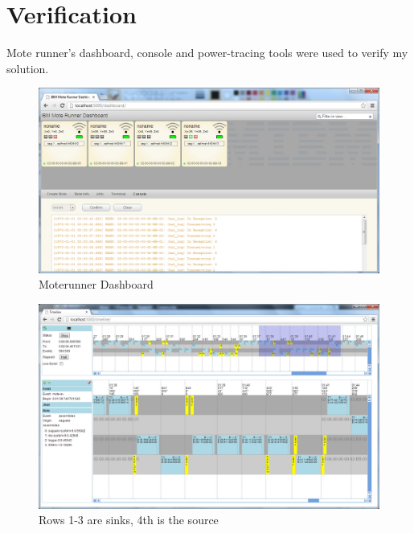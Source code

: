 \documentclass{article}
\begin{document}

\section{Verification}

Mote runner's dashboard, console and power-tracing tools were used to verify my solution.

\noindent\begin{figure}
\centerline{\includegraphics[scale=0.5]{verification-dashboard}}
\caption{Moterunner Dashboard}
\label{fig:verification-dashboard}
\end{figure}
\noindent\begin{figure}
\centerline{\includegraphics[scale=0.5]{verification-timeline}}
\caption{Rows 1-3 are sinks, 4th is the source}
\label{fig:verification-dashboard}
\end{figure}
\end{document}
